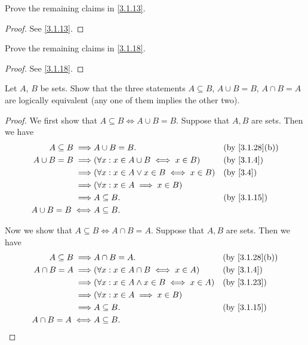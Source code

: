 \begin{ex}\label{ex:3.1.3}
  Prove the remaining claims in \cref{3.1.13}.
\end{ex}

\begin{proof}
  See \cref{3.1.13}.
\end{proof}

\begin{ex}\label{ex:3.1.4}
  Prove the remaining claims in \cref{3.1.18}.
\end{ex}

\begin{proof}
  See \cref{3.1.18}.
\end{proof}

\begin{ex}\label{ex:3.1.5}
  Let \(A\), \(B\) be sets.
  Show that the three statements \(A \subseteq B\), \(A \cup B = B\), \(A \cap B = A\) are logically equivalent (any one of them implies the other two).
\end{ex}

\begin{proof}
  We first show that \(A \subseteq B \iff A \cup B = B\).
  Suppose that \(A, B\) are sets.
  Then we have
  \begin{align*}
    A \subseteq B \implies & A \cup B = B.                                   &  & \text{(by \cref{3.1.28}(b))} \\
    A \cup B = B \implies  & (\forall x : x \in A \cup B \iff x \in B)       &  & \by{3.1.4}                   \\
    \implies               & (\forall x : x \in A \lor x \in B \iff x \in B) &  & \text{(by \cref{3.4})}       \\
    \implies               & (\forall x : x \in A \implies x \in B)                                            \\
    \implies               & A \subseteq B.                                  &  & \text{(by \cref{3.1.15})}    \\
    A \cup B = B \iff      & A \subseteq B.
  \end{align*}

  Now we show that \(A \subseteq B \iff A \cap B = A\).
  Suppose that \(A, B\) are sets.
  Then we have
  \begin{align*}
    A \subseteq B \implies & A \cap B = A.                                    &  & \text{(by \cref{3.1.28}(b))} \\
    A \cap B = A \implies  & (\forall x : x \in A \cap B \iff x \in A)        &  & \by{3.1.4}                   \\
    \implies               & (\forall x : x \in A \land x \in B \iff x \in A) &  & \text{(by \cref{3.1.23})}    \\
    \implies               & (\forall x : x \in A \implies x \in B)                                             \\
    \implies               & A \subseteq B.                                   &  & \text{(by \cref{3.1.15})}    \\
    A \cap B = A \iff      & A \subseteq B.
  \end{align*}
\end{proof}


